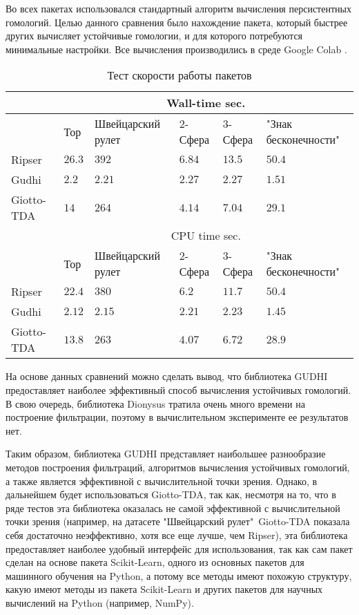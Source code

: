 Во всех пакетах использовался стандартный алгоритм вычисления персистентных гомологий. Целью данного сравнения было нахождение пакета, который быстрее других вычисляет устойчивые гомологии, и для которого потребуются минимальные настройки. Все вычисления производились в среде Google Colab \cite{colab}.
\begin{table}[!htbp]
	\centering
	\small
	\caption{Тест скорости работы пакетов}
	\begin{tabularx}{\linewidth}{|X|X|X|X|X|X|}
		\hline
		& \multicolumn{5}{c|}{Wall-time sec.} \\ \hline
		& Тор & Швейцарский рулет & 2-Сфера & 3-Сфера & "Знак бесконечности" \\ \hline
		Ripser & $26.3$ & $392$ & $6.84$ & $13.5$ & $50.4$ \\ \hline
		Gudhi & $2.2$ & $2.21$ & $2.27$ & $2.27$ & $1.51$ \\ \hline
		Giotto-TDA & $14$ & $264$ & $4.14$ & $7.04$ & $29.1$ \\ \hline
		& \multicolumn{5}{c|}{CPU time sec.} \\ \hline
		& Тор & Швейцарский рулет & 2-Сфера & 3-Сфера & "Знак бесконечности" \\ \hline
		Ripser & $22.4$ & $380$ & $6.2$ & $11.7$ & $50.4$ \\ \hline
		Gudhi & $2.12$ & $2.15$ & $2.21$ & $2.23$ & $1.45$ \\ \hline
		Giotto-TDA & $13.8$ & $263$ & $4.07$ & $6.72$ & $28.9$ \\ \hline
	\end{tabularx}	
	\label{tabl:tests}
\end{table}

На основе данных сравнений можно сделать вывод, что библиотека GUDHI предоставляет наиболее эффективный способ вычисления устойчивых гомологий. В свою очередь, библиотека Dionysus тратила очень много времени на построение фильтрации, поэтому в вычислительном эксперименте ее результатов нет.

Таким образом, библиотека GUDHI представляет наибольшее разнообразие методов построения фильтраций, алгоритмов вычисления устойчивых гомологий, а также является эффективной с вычислительной точки зрения. Однако, в дальнейшем будет использоваться Giotto-TDA, так как, несмотря на то, что в ряде тестов эта библиотека оказалась не самой эффективной с вычислительной точки зрения (например, на датасете "Швейцарский рулет"\ Giotto-TDA показала себя достаточно неэффективно, хотя все еще лучше, чем Ripser), эта библиотека предоставляет наиболее удобный интерфейс для использования, так как сам пакет сделан на основе пакета Scikit-Learn, одного из основных пакетов для машинного обучения на Python, а потому все методы имеют похожую структуру, какую имеют методы из пакета Scikit-Learn и других пакетов для научных вычислений на Python (например, NumPy).
